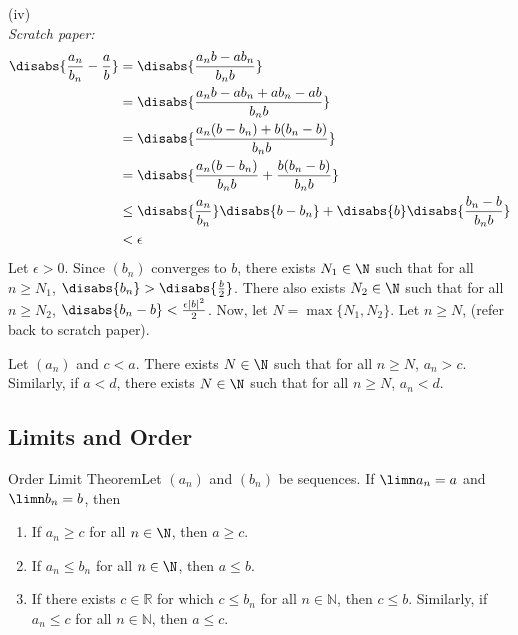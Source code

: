 {(iv) \\
\textit{Scratch paper:}
\begin{align*}
    \disabs{\frac{a_n}{b_n} - \frac{a}{b}} & = \disabs{\frac{a_nb - ab_n}{b_nb}}                                                     \\
                                           & = \disabs{\frac{a_nb - ab_n + ab_n - ab}{b_nb}}                                         \\
                                           & = \disabs{\frac{a_n(b - b_n) + b(b_n - b)}{b_nb}}                                       \\
                                           & = \disabs{\frac{a_n(b - b_n)}{b_nb} + \frac{b(b_n - b)}{b_nb}}                          \\
                                           & \leq \disabs{\frac{a_n}{b_n}}\disabs{b - b_n} + \disabs{b}\disabs{\frac{b_n - b}{b_nb}} \\
                                           & < \epsilon
\end{align*}
Let \(\epsilon > 0\). Since \((b_n)\) converges to \(b\), there exists \(N_1 \in \N\) such that for all \(n \geq N_1\), \(\disabs{b_n } > \disabs{\frac{b}{2}}\). There also exists \(N_2 \in \N\) such that for all \(n \geq N_2\), \(\disabs{b_n - b} < \frac{\epsilon|b|^{2}}{2}\). Now, let \(N = \max\{N_1, N_2\}\). Let \(n \geq N\), (refer back to scratch paper). \qedhere
}

\begin{lemma}
    Let \((a_n)\) and \(c < a\). There exists \(N \in \N\) such that for all \(n \geq N\), \(a_n > c\). Similarly, if \(a < d\), there exists \(N \in \N\) such that for all \(n \geq N\), \(a_n < d\).
\end{lemma}

\subsection{Limits and Order}

\begin{ntheorem}
    {Order Limit Theorem}Let \((a_n)\) and \((b_n)\) be sequences. If \(\limn a_n = a\) and \(\limn b_n = b\), then
    \begin{enumerate}[label=(\roman*)]
        \item If \(a_n \geq c\) for all \(n \in \N\), then \(a \geq c\).
        \item If \(a_n \leq b_n\) for all \(n \in \N\), then \(a \leq b\).
        \item If there exists \( c \in \mathbb{R} \) for which \( c \leq b_n \) for all \( n \in \mathbb{N} \), then \( c \leq b \). Similarly, if \( a_n \leq c \) for all \( n \in \mathbb{N} \), then \( a \leq c \).

    \end{enumerate}
\end{ntheorem}




